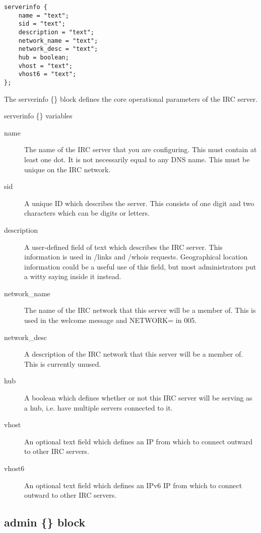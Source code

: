 \begin{verbatim}
serverinfo {
	name = "text";
	sid = "text";
	description = "text";
	network_name = "text";
	network_desc = "text";
	hub = boolean;
	vhost = "text";
	vhost6 = "text";
};\end{verbatim}

	The serverinfo \{\} block defines the core operational parameters of
	the IRC server.


{\sc serverinfo \{\} variables}
\nopagebreak

\noindent
\begin{description}
\item[{name}]
	The name of the IRC server that you are configuring. This must contain
	at least one dot. It is not necessarily equal to any DNS name. This
	must be unique on the IRC network.

\item[{sid}]
	A unique ID which describes the server.
	This consists of one digit and two characters which can be digits or
	letters.

\item[{description}]
	A user-{}defined field of text which describes the IRC server.
	This information is used in /links and /whois requests. Geographical
	location information could be a useful use of this field, but most
	administrators put a witty saying inside it instead.

\item[{network\_name}]
	The name of the IRC network that this server will be a member of.
	This is used in the welcome message and NETWORK= in 005.

\item[{network\_desc}]
	A description of the IRC network that this server will be a member of.
	This is currently unused.

\item[{hub}]
	A boolean which defines whether or not this IRC server will be serving
	as a hub, i.e. have multiple servers connected to it.

\item[{vhost}]
	An optional text field which defines an IP from which to connect
	outward to other IRC servers.

\item[{vhost6}]
	An optional text field which defines an IPv6 IP from which to connect
	outward to other IRC servers.
\end{description}


\subsection{admin \{\} block}

